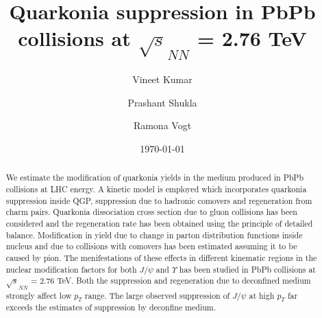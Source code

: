 \documentclass[aps,prc,preprint,superscriptaddress,showpacs,showkeys]{revtex4-1}
\begin{document}
\newcommand{\Jpsi}{J/\psi}
\newcommand{\pT}{p_{T}}

\title{{\Large Quarkonia suppression in PbPb collisions at $\sqrt s_{NN}$ =  2.76 TeV }}
\author{\large Vineet Kumar}
\author{\large Prashant Shukla}
\author{\large Ramona Vogt}
\date{\today}

\begin{abstract}
  We estimate the modification of quarkonia yields in the medium produced in PbPb
collisions at LHC energy. A kinetic model is employed which incorporates quarkonia  
suppression inside QGP, suppression due to hadronic comovers and 
regeneration from charm pairs.
 Quarkonia dissociation cross section due to gluon collisions has been considered and
the regeneration rate has been obtained using the principle of detailed balance.
Modification in yield due to change in parton distribution functions inside nucleus and 
due to collisions with comovers has been estimated assuming it to be caused by pion.  
  The menifestations of these effects in different kinematic regions in
the nuclear modification factors for both $\Jpsi$ and $\Upsilon$ has been studied
in PbPb collisions at $\sqrt s_{NN}$ =  2.76 TeV. 
  Both the suppression and regeneration due to deconfined medium strongly affect 
low $\pT$ range. The large observed suppression of $\Jpsi$ at high $p_T$ far exceeds
the estimates of suppression by deconfine medium.
\end{abstract}

\maketitle
\end{document}
